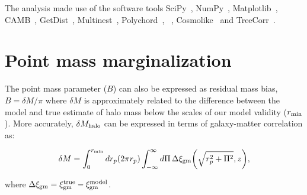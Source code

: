 \documentclass[aps, prd,twocolumn,superscriptaddress,nofootinbib,preprintnumbers]{revtex4-1}
\begin{document}


The analysis made use of the software tools {\sc SciPy}~\cite{2020SciPy-NMeth}, {\sc NumPy}~\cite{2020NumPy-Array},  {\sc Matplotlib}~\cite{Hunter:2007}, {\sc CAMB}~\cite{Lewis:1999bs,Lewis:2002ah,Howlett:2012mh}, {\sc GetDist}~\cite{Lewis:2019xzd}, {\sc Multinest}~\cite{Feroz_2008,Feroz_2009,Feroz_2019},  {\sc Polychord}~\cite{Handley_2015}, \cosmosis~\cite{Zuntz_2015}, {\sc Cosmolike}~\cite{Krause_2017} and {\sc TreeCorr}~\cite{Jarvis_2004}.










\appendix



\section{Point mass marginalization}
\label{app:pm}
The point mass parameter ($B$) can also be expressed as residual mass bias, $B = \delta M/\pi$ where $\delta M$ is approximately related to the difference between the model and true estimate of halo mass below the scales of our model validity ($r_{\rm min}$). More accurately, $\delta M_{\rm halo}$ can be expressed in terms of galaxy-matter correlation as:
\begin{linenomath*}
\begin{equation}
\label{eq:pm_halo}
    \delta M = \int_{0}^{r_{\rm min}} dr_p (2\pi r_p) \int_{-\infty}^{\infty} d\Pi \, \Delta \xi_{\rm gm}\bigg(\sqrt{r_p^2 + \Pi^2}, z \bigg), 
\end{equation}
\end{linenomath*}
where $\Delta \xi_{\rm gm} = \xi^{\rm true}_{\rm gm} - \xi^{\rm model}_{\rm gm}$.
\end{document}
